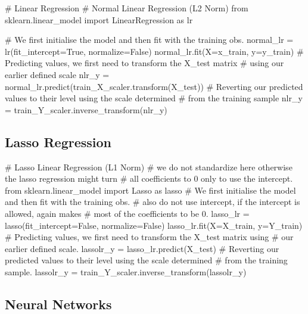 \documentclass[11pt]{article}
\begin{document}
\begin{pyconsole}[][]
# Linear Regression
# Normal Linear Regression (L2 Norm)
from sklearn.linear_model import LinearRegression as lr

# We first initialise the model and then fit with the training obs.
normal_lr = lr(fit_intercept=True, normalize=False)
normal_lr.fit(X=x_train, y=y_train)
# Predicting values, we first need to transform the X_test matrix
# using our earlier defined scale
nlr_y = normal_lr.predict(train_X_scaler.transform(X_test))
# Reverting our predicted values to their level using the scale determined
# from the training sample
nlr_y = train_Y_scaler.inverse_transform(nlr_y)
\end{pyconsole}

\subsection{Lasso Regression}\label{subsec:lasso-regression}
\begin{pyconsole}[][]
# Lasso Linear Regression (L1 Norm)
# we do not standardize here otherwise the lasso regression might turn
# all coefficients to 0 only to use the intercept.
from sklearn.linear_model import Lasso as lasso
# We first initialise the model and then fit with the training obs.
# also do not use intercept, if the intercept is allowed, again makes
# most of the coefficients to be 0.
lasso_lr = lasso(fit_intercept=False, normalize=False)
lasso_lr.fit(X=X_train, y=Y_train)
# Predicting values, we first need to transform the X_test matrix using
# our earlier defined scale.
lassolr_y = lasso_lr.predict(X_test)
# Reverting our predicted values to their level using the scale determined
# from the training sample.
lassolr_y = train_Y_scaler.inverse_transform(lassolr_y)
\end{pyconsole}

\subsection{Neural Networks}\label{subsec:neural-networks}
\end{document}
